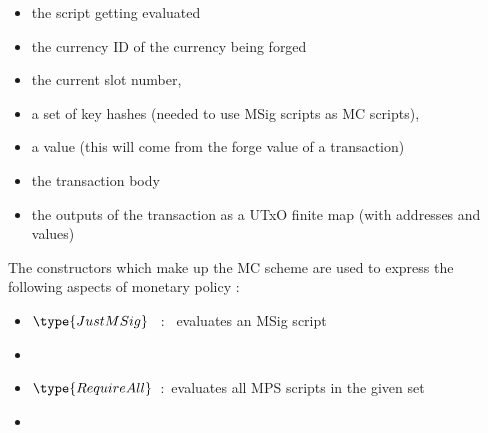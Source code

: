 \begin{itemize}
\item the script getting evaluated
\item the currency ID of the currency being forged
\item the current slot number,
\item a set of key hashes (needed to use MSig scripts as MC scripts),
\item a value (this will come from the forge value of a transaction)
\item the transaction body
\item the outputs of the transaction as a UTxO finite map (with addresses and values)
\end{itemize}

The constructors which make up the MC scheme are used to express the following
aspects of monetary policy :

\begin{itemize}
\item $\type{JustMSig}$~ :~ evaluates an MSig script

\item

\item $\type{RequireAll}$~:~evaluates all MPS scripts in the given set

\item
\end{itemize}

